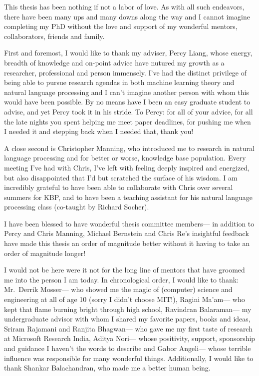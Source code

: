This thesis has been nothing if not a labor of love.
As with all such endeavors, there have been many ups and many downs along the way and I cannot imagine completing my PhD without the love and support of my wonderful mentors, collaborators, friends and family.

First and foremost, I would like to thank my adviser, Percy Liang, whose energy, breadth of knowledge and on-point advice have nutured my growth as a researcher, professional and person immensely.
I've had the distinct privilege of being able to pursue research agendas in both machine learning theory and natural language processing and I can't imagine another person with whom this would have been possible.
By no means have I been an easy graduate student to advise, and yet Percy took it in his stride.
To Percy: for all of your advice, for all the late nights you spent helping me meet paper deadlines, for pushing me when I needed it and stepping back when I needed that, thank you!

A close second is Christopher Manning, who introduced me to research in natural language processing and for better or worse, knowledge base population.
Every meeting I've had with Chris, I've left with feeling deeply inspired and energized, but also disappointed that I'd but scratched the surface of his wisdom.
I am incredibly grateful to have been able to collaborate with Chris over several summers for KBP, and to have been a teaching assistant for his natural language processing class (co-taught by Richard Socher).

I have been blessed to have wonderful thesis committee members--- in addition to Percy and Chris Manning, Michael Bernstein and Chris Re's insightful feedback have made this thesis an order of magnitude better without it having to take an order of magnitude longer!

I would not be here were it not for the long line of mentors that have groomed me into the person I am today.
In chronological order, I would like to thank:
Mr.\ Derrik Mosser--- who showed me the magic of (computer) science and engineering at all of age 10 (sorry I didn't choose MIT!), 
Ragini Ma'am--- who kept that flame burning bright through high school,
Ravindran Balaraman--- my undergraduate advisor with whom I shared my favorite papers, books and ideas, 
Sriram Rajamani and Ranjita Bhagwan--- who gave me my first taste of research at Microsoft Research India,
Aditya Nori--- whose positivity, support, sponsorship and guidance I haven't the words to describe
and
Gabor Angeli--- whose terrible influence was responsible for many wonderful things.
Additionally, I would like to thank Shankar Balachandran, who made me a better human being.

